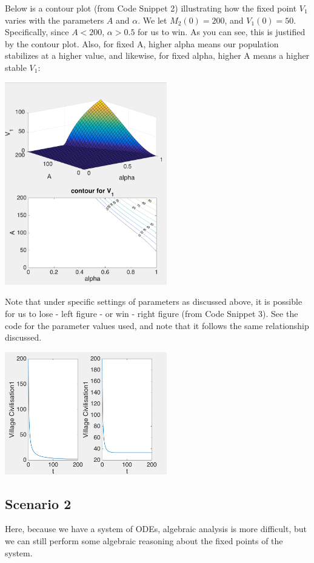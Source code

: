 \documentclass[12pt]{article}
\begin{document}
Below is a contour plot (from Code Snippet 2) illustrating how the fixed point $V_1$ varies with the parameters $A$ and $\alpha$. We let $M_2(0) = 200$, and $V_1(0) = 50$. Specifically, since $A < 200$, $\alpha > 0.5$ for us to win. As you can see, this is justified by the contour plot. Also, for fixed A, higher alpha means our population stabilizes at a higher value, and likewise, for fixed alpha, higher A means a higher stable $V_1$:
\begin{center}
\includegraphics[width=200pt]{contourplot_basic}
\end{center}

Note that under specific settings of parameters as discussed above, it is possible for us to lose - left figure - or win - right figure (from Code Snippet 3). See the code for the parameter values used, and note that it follows the same relationship discussed.
\begin{center}
\includegraphics[width=200pt]{graph_basic}
\end{center}

\subsection{Scenario 2}
Here, because we have a system of ODEs, algebraic analysis is more difficult, but we can still perform some algebraic reasoning about the fixed points of the system.
\end{document}
